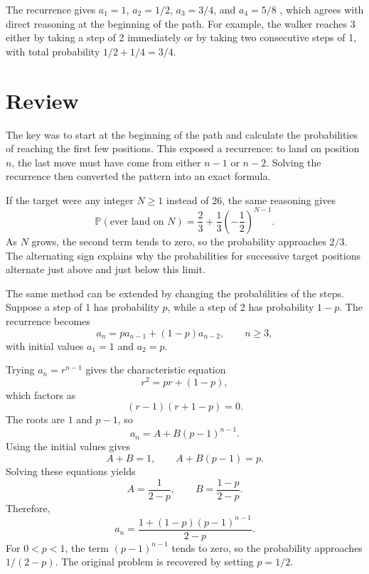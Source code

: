 \documentclass[11pt]{article}
\newcommand{\keywordfont}{\textsc}
\newcommand{\keyword}[1]{%
  \marginpar{\raggedright\small\keywordfont{#1}}}
\begin{document}
The recurrence gives $a_1=1$, $a_2=1/2$, $a_3=3/4$, and $a_4=5/8$ \keyword{CHECK}, which agrees with direct reasoning at the beginning of the path. For example, the walker reaches 3 either by taking a step of 2 immediately or by taking two consecutive steps of 1, with total probability $1/2+1/4=3/4$.

\section{Review}

The key \keyword{REFLECT} was to start at the beginning of the path and calculate the probabilities of reaching the first few positions. This exposed a recurrence: to land on position $n$, the last move must have come from either $n-1$ or $n-2$. Solving the recurrence then converted the pattern into an exact formula.

If the target were any integer \keyword{EXTENSION} $N\geq 1$ instead of 26, the same reasoning gives
\[
 \mathbb{P}(\text{ever land on }N)
 =\frac23+\frac13\left(-\frac12\right)^{N-1}.
\]
As $N$ grows, the second term tends to zero, so the probability approaches $2/3$. The alternating sign explains why the probabilities for successive target positions alternate just above and just below this limit.

The same method can be extended \keyword{GENERALISE} by changing the probabilities of the steps. Suppose a step of 1 has probability \(p\), while a step of 2 has probability \(1-p\). The recurrence becomes
\[
a_n=pa_{n-1}+(1-p)a_{n-2},\qquad n\geq 3,
\]
with initial values \(a_1=1\) and \(a_2=p\).

Trying \(a_n=r^{n-1}\) gives the characteristic equation
\[
r^2=pr+(1-p),
\]
which factors as
\[
(r-1)(r+1-p)=0.
\]
The roots are \(1\) and \(p-1\), so
\[
a_n=A+B(p-1)^{n-1}.
\]
Using the initial values gives
\[
A+B=1,\qquad A+B(p-1)=p.
\]
Solving these equations yields
\[
A=\frac{1}{2-p},\qquad B=\frac{1-p}{2-p}.
\]
Therefore,
\[
\boxed{a_n=\frac{1+(1-p)(p-1)^{n-1}}{2-p}}.
\]
For \(0<p<1\), the term \((p-1)^{n-1}\) tends to zero, so the probability approaches \(1/(2-p)\). The original problem is recovered by setting \(p=1/2\).
\end{document}
